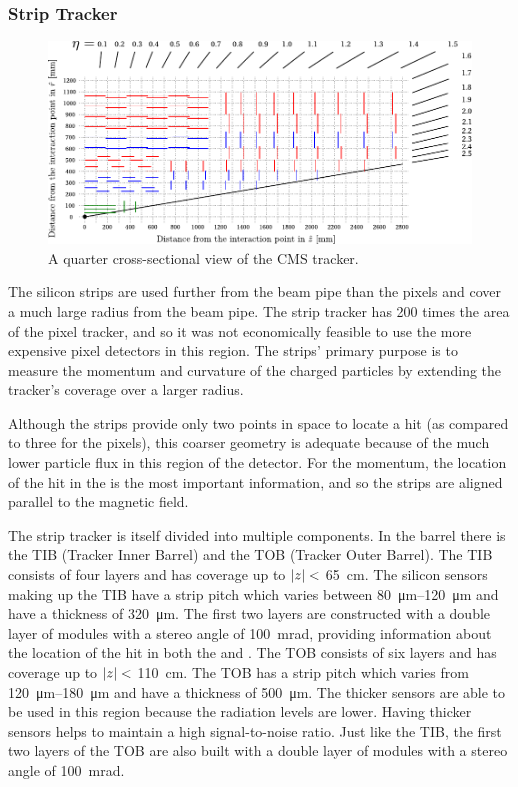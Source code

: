 \subsubsection{Strip Tracker}

\begin{figure}[!htbp]
    \centering
    \includegraphics[width=\textwidth]{figures/tracker_cross_section.pdf}
    \caption{
        A quarter cross-sectional view of the CMS tracker.
    }
    \label{fig:strip_layout}
\end{figure}

The silicon strips are used further from the beam pipe than the pixels and
cover a much large radius from the beam pipe. The strip tracker has \num{200}
times the area of the pixel tracker, and so it was not economically feasible to
use the more expensive pixel detectors in this region. The strips' primary
purpose is to measure the momentum and curvature of the charged particles by
extending the tracker's coverage over a larger radius.

Although the strips provide only two points in space to locate a hit (as
compared to three for the pixels), this coarser geometry is adequate because of
the much lower particle flux in this region of the detector. For the momentum,
the location of the hit in the \rphiplane is the most important information,
and so the strips are aligned parallel to the magnetic field.

The strip tracker is itself divided into multiple components. In the barrel
there is the TIB (Tracker Inner Barrel) and the TOB (Tracker Outer Barrel). The
TIB consists of four layers and has coverage up to $|z|<$
\SI{65}{\centi\meter}. The silicon sensors making up the TIB have a strip pitch
which varies between \SIrange{80}{120}{\micro\meter} and have a thickness of
\SI{320}{\micro\meter}. The first two layers are constructed with a double
layer of modules with a stereo angle of \SI{100}{\milli\radian}, providing
information about the location of the hit in both the \coordrphi and \rzplane.
The TOB consists of six layers and has coverage up to $|z|<$
\SI{110}{\centi\meter}. The TOB has a strip pitch which varies from
\SIrange{120}{180}{\micro\meter} and have a thickness of
\SI{500}{\micro\meter}. The thicker sensors are able to be used in this region
because the radiation levels are lower. Having thicker sensors helps to
maintain a high signal-to-noise ratio. Just like the TIB, the first two layers
of the TOB are also built with a double layer of modules with a stereo angle of
\SI{100}{\milli\radian}.

